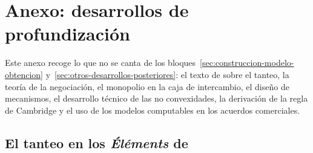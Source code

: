 \documentclass[11pt]{article}
\begin{document}
\section{Anexo: desarrollos de profundización}\label{anexo:profundizacion}

Este anexo recoge lo que no se canta de los bloques~\ref{sec:construccion-modelo-obtencion} y~\ref{sec:otros-desarrollos-posteriores}: el texto de  sobre el tanteo, la teoría de la negociación, el monopolio en la caja de intercambio, el diseño de mecanismos, el desarrollo técnico de las no convexidades, la derivación de la regla de Cambridge y el uso de los modelos computables en los acuerdos comerciales.

\subsection{El tanteo en los \emph{Éléments} de }\label{anexo:tanteo-walras}
\end{document}
